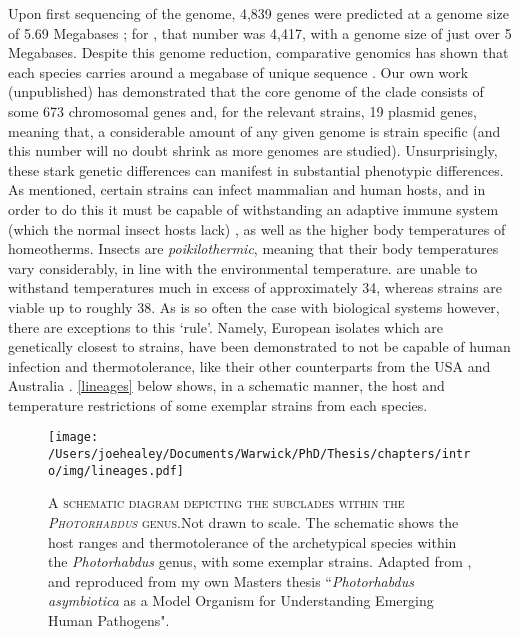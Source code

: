 Upon first sequencing of the \Plum{} genome, 4,839 genes were predicted at a genome size of 5.69 Megabases \citep{Duchaud2003}; for \Pasy, that number was 4,417, with a genome size of just over 5 Megabases. Despite this genome reduction, comparative genomics has shown that each species carries around a megabase of unique sequence \citep{Wilkinson2009a}. Our own work (unpublished) has demonstrated that the core genome of the clade consists of some 673 chromosomal genes and, for the relevant strains, 19 plasmid genes, meaning that, a considerable amount of any given \Pa{} genome is strain specific (and this number will no doubt shrink as more genomes are studied). Unsurprisingly, these stark genetic differences can manifest in substantial phenotypic differences. As mentioned, certain \Pasy{} strains can infect mammalian and human hosts, and in order to do this it must be capable of withstanding an adaptive immune system (which the normal insect hosts lack) \citep{Lemaitre2007a}, as well as the higher body temperatures of homeotherms. Insects are \emph{poikilothermic}, meaning that their body temperatures vary considerably, in line with the environmental temperature. \Plum{} are unable to withstand temperatures much in excess of approximately 34\degC, whereas \Pasy{} strains are viable up to roughly 38\degC. As is so often the case with biological systems however, there are exceptions to this `rule'. Namely, European isolates which are genetically closest to \Pasy{} strains, have been demonstrated to not be capable of human infection and thermotolerance, like their other \Pasy{} counterparts from the USA and Australia \citep{Peat2010, Mulley2015}. \vref{lineages} below shows, in a schematic manner, the host and temperature restrictions of some exemplar strains from each species.

\begin{figure}[h]
    \texttt{[image: /Users/joehealey/Documents/Warwick/PhD/Thesis/chapters/intro/img/lineages.pdf]}
    \captionsetup{singlelinecheck=off, justification=justified, font=footnotesize, aboveskip=0pt}
    \caption[Schematic diagram of \emph{Photorhabdus} lineages]{\textsc{\normalsize A schematic diagram depicting the subclades within the \emph{Photorhabdus} genus.}\vspace{0.1cm}\newline Not drawn to scale. The schematic shows the host ranges and thermotolerance of the archetypical species within the \emph{Photorhabdus} genus, with some exemplar strains. Adapted from \citep{Waterfield2009}, and reproduced from my own Masters thesis ``\emph{Photorhabdus asymbiotica} as a Model Organism for Understanding Emerging Human Pathogens".}\label{lineages}
\end{figure}

